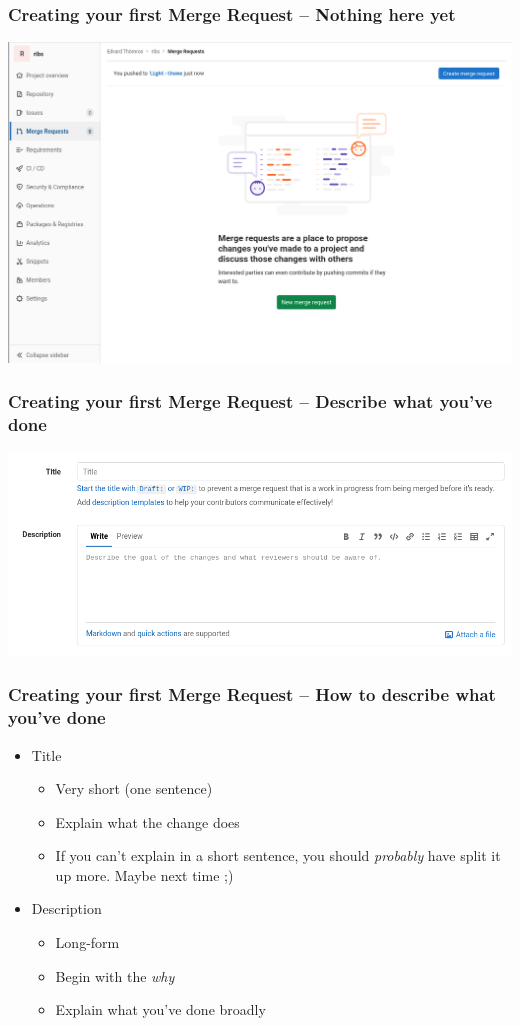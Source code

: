 \documentclass{beamer}
\begin{document}
\begin{frame}[fragile]
  \frametitle{Creating your first Merge Request -- Nothing here yet}
  \includegraphics[width=\linewidth]{merge-request/mr-menu-empty.png}
\end{frame}

\begin{frame}[fragile]
  \frametitle{Creating your first Merge Request -- Describe what you've done}
  \includegraphics[width=\linewidth]{merge-request/mr-create-01-empty.png}
\end{frame}

\begin{frame}
  \frametitle{Creating your first Merge Request -- How to describe what you've done}
  \begin{itemize}[<+->]
    \item Title
    \begin{itemize}[<+->]
      \item Very short (one sentence)
      \item Explain what the change does
      \item If you can't explain in a short sentence, you should \emph{probably}
            have split it up more. Maybe next time ;)
    \end{itemize}
    \item Description
      \begin{itemize}[<+->]
        \item Long-form
        \item Begin with the \emph{why}
        \item Explain what you've done broadly
      \end{itemize}
  \end{itemize}
\end{frame}
\end{document}
